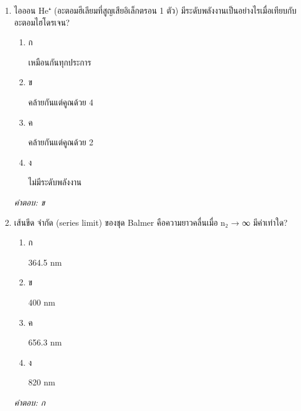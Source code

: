 \documentclass[12pt]{article}
\begin{document}
\begin{enumerate}[label=\arabic*., itemsep=0.5\baselineskip, topsep=0.5\baselineskip, leftmargin=*]
\item ไอออน He⁺ (อะตอมฮีเลียมที่สูญเสียอิเล็กตรอน 1 ตัว) มีระดับพลังงานเป็นอย่างไรเมื่อเทียบกับอะตอมไฮโดรเจน?
\begin{enumerate}[label=\alph*)., itemsep=0.3\baselineskip, topsep=0.3\baselineskip]
\item ก\ 
\begin{minipage}[t]{0.9\linewidth}
\raggedright เหมือนกันทุกประการ
\end{minipage}
\item ข\ 
\begin{minipage}[t]{0.9\linewidth}
\raggedright คล้ายกันแต่คูณด้วย 4
\end{minipage}
\item ค\ 
\begin{minipage}[t]{0.9\linewidth}
\raggedright คล้ายกันแต่คูณด้วย 2
\end{minipage}
\item ง\ 
\begin{minipage}[t]{0.9\linewidth}
\raggedright ไม่มีระดับพลังงาน
\end{minipage}
\end{enumerate}
\vspace{-0.3\baselineskip}
\begin{small}
\textit{คำตอบ: ข}
\end{small}

\item เส้นขีด จำกัด (series limit) ของชุด Balmer คือความยาวคลื่นเมื่อ n₂ → ∞ มีค่าเท่าใด?
\begin{enumerate}[label=\alph*)., itemsep=0.3\baselineskip, topsep=0.3\baselineskip]
\item ก\ 
\begin{minipage}[t]{0.9\linewidth}
\raggedright 364.5 nm
\end{minipage}
\item ข\ 
\begin{minipage}[t]{0.9\linewidth}
\raggedright 400 nm
\end{minipage}
\item ค\ 
\begin{minipage}[t]{0.9\linewidth}
\raggedright 656.3 nm
\end{minipage}
\item ง\ 
\begin{minipage}[t]{0.9\linewidth}
\raggedright 820 nm
\end{minipage}
\end{enumerate}
\vspace{-0.3\baselineskip}
\begin{small}
\textit{คำตอบ: ก}
\end{small}


\end{enumerate}
\end{document}
